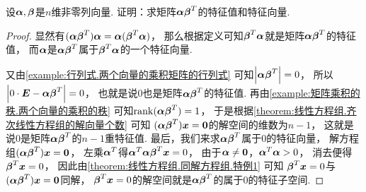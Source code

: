 \begin{example}\label{example:矩阵乘积的秩.两个向量的乘积的特征值和特征向量}
设\(\boldsymbol\alpha,\boldsymbol\beta\)是\(n\)维非零列向量.
证明：求矩阵\(\boldsymbol\alpha\boldsymbol\beta^T\)的特征值和特征向量.
\begin{proof}
显然有\((\boldsymbol\alpha\boldsymbol\beta^T)\boldsymbol\alpha = \boldsymbol\alpha(\boldsymbol\beta^T\boldsymbol\alpha)\)，
那么根据定义可知\(\boldsymbol\beta^T\boldsymbol\alpha\)就是矩阵\(\boldsymbol\alpha\boldsymbol\beta^T\)的特征值，
而\(\boldsymbol\alpha\)是\(\boldsymbol\alpha\boldsymbol\beta^T\)属于\(\boldsymbol\beta^T\boldsymbol\alpha\)的一个特征向量.

又由\cref{example:行列式.两个向量的乘积矩阵的行列式} 可知\(\abs{\boldsymbol\alpha\boldsymbol\beta^T} = 0\)，
所以\(\abs{0\cdot\boldsymbol{E}-\boldsymbol\alpha\boldsymbol\beta^T}=0\)，
也就是说\(0\)也是矩阵\(\boldsymbol\alpha\boldsymbol\beta^T\)的特征值.
再由\cref{example:矩阵乘积的秩.两个向量的乘积的秩} 可知\(\rank(\boldsymbol\alpha\boldsymbol\beta^T) = 1\)，
于是根据\cref{theorem:线性方程组.齐次线性方程组的解向量个数} 可知
\((\boldsymbol\alpha\boldsymbol\beta^T)\boldsymbol{x}=\boldsymbol0\)的解空间的维数为\(n-1\)，
这就是说\(0\)是矩阵\(\boldsymbol\alpha\boldsymbol\beta^T\)的\(n-1\)重特征值.
最后，我们来求\(\boldsymbol\alpha\boldsymbol\beta^T\)属于\(0\)的特征向量，
解方程组\((\boldsymbol\alpha\boldsymbol\beta^T)\boldsymbol{x}=\boldsymbol0\)，
左乘\(\boldsymbol\alpha^T\)得\(\boldsymbol\alpha^T\boldsymbol\alpha\boldsymbol\beta^T\boldsymbol{x}=0\)，
由于\(\boldsymbol\alpha\neq\boldsymbol0\)，\(\boldsymbol\alpha^T\boldsymbol\alpha>0\)，
消去便得\(\boldsymbol\beta^T\boldsymbol{x}=0\)，
因此由\cref{theorem:线性方程组.同解方程组.特例1} 可知
\(\boldsymbol\beta^T\boldsymbol{x}=0\)与\((\boldsymbol\alpha\boldsymbol\beta^T)\boldsymbol{x}=\boldsymbol0\)同解，
\(\boldsymbol\beta^T\boldsymbol{x}=0\)的解空间就是\(\boldsymbol\alpha\boldsymbol\beta^T\)的属于\(0\)的特征子空间.
\end{proof}
\end{example}

